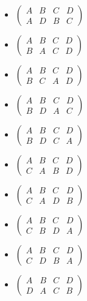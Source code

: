 \begin{enumerate}[{a.}]
\begin{multicols}{3}
\begin{itemize}
	\item
	$\begin{pmatrix}
	A & B & C & D\\
	A & D & B & C
	\end{pmatrix}$
	
	\item
	$\begin{pmatrix}
	A & B & C & D\\	
	B & A & C & D
	\end{pmatrix}$
	
	\item
	$\begin{pmatrix}
	A & B & C & D\\
	B & C & A & D
	\end{pmatrix}$
	
	\item
	$\begin{pmatrix}
	A & B & C & D\\
	B & D & A & C
	\end{pmatrix}$
	
	\item
	$\begin{pmatrix}
	A & B & C & D\\
	B & D & C & A
	\end{pmatrix}$
	
	\item
	$\begin{pmatrix}
	A & B & C & D\\
	C & A & B & D
	\end{pmatrix}$
	
	\item
	$\begin{pmatrix}
	A & B & C & D\\
	C & A & D & B
	\end{pmatrix}$
	
	\item
	$\begin{pmatrix}
	A & B & C & D\\
	C & B & D & A
	\end{pmatrix}$
	
	\item
	$\begin{pmatrix}
	A & B & C & D\\
	C & D & B & A
	\end{pmatrix}$
	
	\item
	$\begin{pmatrix}
	A & B & C & D\\
	D & A & C & B
	\end{pmatrix}$
	

\end{itemize}
\end{multicols}
\end{enumerate}

